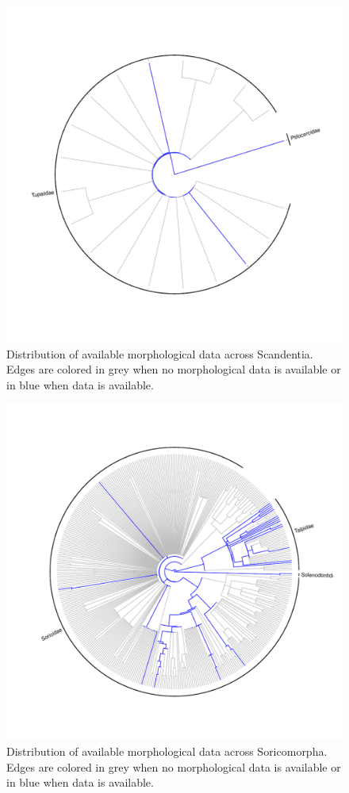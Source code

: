 \documentclass[12pt,letterpaper]{article}
\begin{document}
\begin{figure}[!htbp]
\centering
    \includegraphics[width=1\textwidth]{Supp_figure_SCANDENTIA.pdf}
\caption{Distribution of available morphological data across Scandentia. Edges are colored in grey when no morphological data is available or in blue when data is available.}
\label{Supp_Figure_Phylo-Scandentia}
\end{figure}

\begin{figure}[!htbp]
\centering
    \includegraphics[width=1\textwidth]{Supp_figure_SORICOMORPHA.pdf}
\caption{Distribution of available morphological data across Soricomorpha. Edges are colored in grey when no morphological data is available or in blue when data is available.}
\label{Supp_Figure_Phylo-Soricomorpha}
\end{figure}
\end{document}
